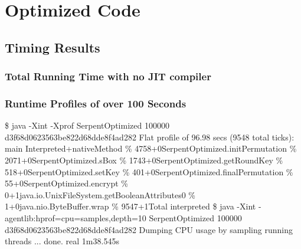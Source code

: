 \documentclass[12pt]{article} %
\newcommand{\tab}{\hspace*{2em}}
\begin{document}
\section{Optimized Code}
\subsection{Timing Results}
\subsubsection{Total Running Time with no JIT compiler}

\subsubsection{Runtime Profiles of over 100 Seconds}
\$ java -Xint -Xprof SerpentOptimized 100000
\newline d3f68d0623563be822d68dde8f4ad282 
\newline Flat profile of 96.98 secs (9548 total ticks): main
\newline   Interpreted\tab +\tab native\tab   Method                        
\tab\%  4758\tab  +\tab     0\tab    SerpentOptimized.initPermutation
\tab\%  2071\tab  +\tab     0\tab    SerpentOptimized.sBox
\tab\%  1743\tab  +\tab     0\tab    SerpentOptimized.getRoundKey
\tab\%   518\tab  +\tab     0\tab    SerpentOptimized.setKey
\tab\%   401\tab  +\tab     0\tab    SerpentOptimized.finalPermutation
\tab\%    55\tab  +\tab     0\tab    SerpentOptimized.encrypt
\tab\%     0\tab  +\tab     1\tab    java.io.UnixFileSystem.getBooleanAttributes0
\tab\%     1\tab  +\tab     0\tab    java.nio.ByteBuffer.wrap
\tab\%  9547\tab  +\tab     1\tab    Total interpreted
\newline\$ java -Xint -agentlib:hprof=cpu=samples,depth=10 SerpentOptimized 100000
\newline d3f68d0623563be822d68dde8f4ad282
\newline Dumping CPU usage by sampling running threads ... done.
\newline real	1m38.545s
\end{document}
